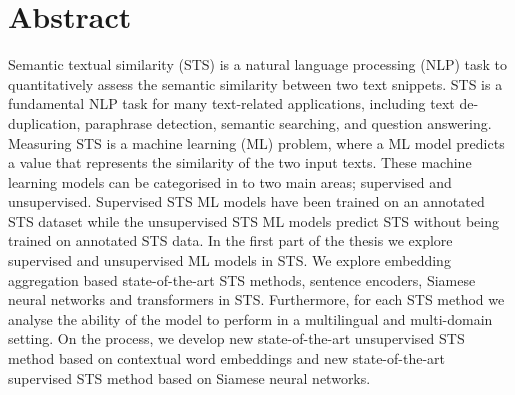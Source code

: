 
\chapter*{Abstract}
\label{cha:introduction}

Semantic textual similarity (STS) is a natural language processing (NLP) task to quantitatively assess the semantic similarity between two text snippets. STS is a fundamental NLP task for many text-related applications, including text de-duplication, paraphrase detection, semantic searching, and question answering. Measuring STS is a machine learning (ML) problem, where a ML model predicts a value that represents the similarity of the two input texts. These machine learning models can be categorised in to two main areas; supervised and unsupervised. Supervised STS ML models have been trained on an annotated STS dataset while the unsupervised STS ML models predict STS without being trained on annotated STS data. In the first part of the thesis we explore supervised and unsupervised ML models in STS. We explore embedding aggregation based state-of-the-art STS methods, sentence encoders, Siamese neural networks and transformers in STS. Furthermore, for each STS method we analyse the ability of the model to perform in a multilingual and multi-domain setting. On the process, we develop new state-of-the-art unsupervised STS method based on contextual word embeddings and new state-of-the-art supervised STS method based on Siamese neural networks. 


